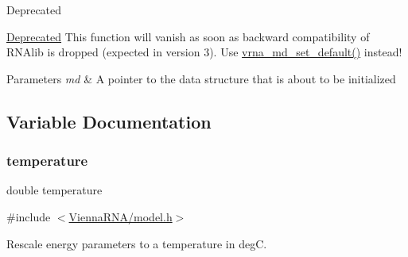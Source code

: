 \begin{DoxyRefDesc}{Deprecated}
\item[\mbox{\hyperlink{deprecated__deprecated000091}{Deprecated}}]This function will vanish as soon as backward compatibility of R\+N\+Alib is dropped (expected in version 3). Use \mbox{\hyperlink{group__model__details_ga8ac6ff84936282436f822644bf841f66}{vrna\+\_\+md\+\_\+set\+\_\+default()}} instead!\end{DoxyRefDesc}



\begin{DoxyParams}{Parameters}
{\em md} & A pointer to the data structure that is about to be initialized \\
\hline
\end{DoxyParams}


\subsection{Variable Documentation}
\mbox{\label{group__model__details_gab4b11c8d9c758430960896bc3fe82ead}} 
\subsubsection{\texorpdfstring{temperature}{temperature}}
{\footnotesize\ttfamily double temperature}



{\ttfamily \#include $<$\mbox{\hyperlink{model_8h}{Vienna\+R\+N\+A/model.\+h}}$>$}



Rescale energy parameters to a temperature in degC. 

